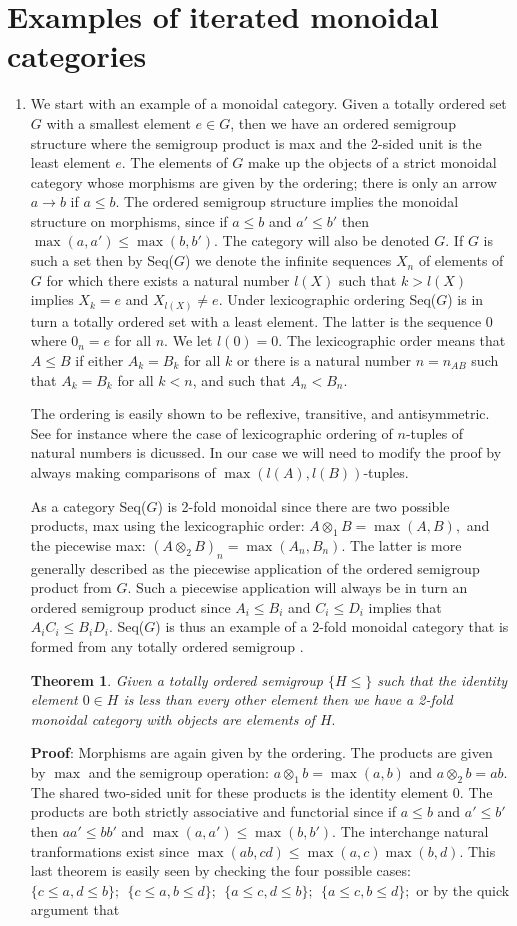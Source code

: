 \documentclass{tac}
\newtheorem{theorem}{Theorem}
\newcommand{\MySection}[1]
{\section{ #1}}
\begin{document}
{\newpage   
\MySection{Examples of iterated monoidal categories} 
\begin{enumerate}
\item
We start with an example of a monoidal category. Given a totally ordered set $G$ with a smallest element $e \in G$, 
then we have an ordered semigroup structure where the semigroup product is max and the 2-sided unit is the
least element $e$. The elements of $G$ make up the objects of a strict monoidal category whose morphisms are
given by the ordering; there is only an arrow $a \to b$ if $a\le b.$ The ordered semigroup structure implies
the monoidal structure on morphisms, since if $a\le b$ and $a'\le b'$ 
 then $\max(a,a')\le\max(b,b').$ The category will also be denoted $G.$ 
If $G$ is such a set then by Seq($G$) we denote the infinite sequences $X_n$ of elements of $G$ for which
there exists a natural number $l(X)$ such that $k> l(X)$ implies $X_k = e$ and $X_{l(X)}\ne e.$ 
Under lexicographic ordering Seq($G$) is
in turn a totally ordered set with a least element. The latter is the sequence 0 where $0_n = e$ for all $n.$
We let $l(0) = 0.$
The lexicographic order
means that $A \le B$ if either $A_k = B_k$ for all $k$ or there is a natural number $n=n_{AB}$ such that 
$A_k = B_k$ for all $k < n$, and such that $A_{n} < B_{n}.$ 

The ordering is easily shown to be reflexive, transitive, and antisymmetric. See for instance \cite{Schrod}
where the case of lexicographic ordering of $n$-tuples of natural numbers is dicussed. In our case we will need
to modify the proof by always making comparisons of $\max(l(A),l(B))$-tuples. 

As a category Seq($G$) is 2-fold monoidal since 
there are two possible products, max using the lexicographic order: $A\otimes_1 B = \max(A,B),$ 
and the piecewise max: $(A \otimes_2 B)_n = \max(A_n, B_n).$ The latter is  more generally described as
the piecewise application of the ordered semigroup product from $G.$ Such a piecewise application
will always be in turn an ordered
semigroup product since $A_i \le B_i$ and $C_i \le D_i$
implies that $A_iC_i \le B_iD_i$. Seq($G$) is thus an example of 
a $2$-fold monoidal category that is formed from any totally ordered semigroup . 
\begin{theorem}\label{semi}
Given a totally ordered semigroup $\{H\le\}$
such that the
identity element $0 \in H$ is less than every other element then 
we have a 2-fold monoidal category with 
objects are elements of $H.$ 
\end{theorem}
{\bf Proof}: Morphisms
are again given by the ordering. The products are given by
 $\max$ and the semigroup operation: $a\otimes_1b = \max(a,b)$ and $a\otimes_2b = ab$. 
 The shared two-sided unit for these products is 
 the identity element $0.$ The products are both strictly associative and functorial since if $a\le b$ and $a'\le b'$ 
 then $aa'\le bb'$ and $\max(a,a')\le\max(b,b').$
 The interchange natural tranformations exist since $\max(ab,cd)\le\max(a,c)\max(b,d).$ This last theorem is easily seen by checking the four
 possible cases: $\{c\le a, d\le b\};~~\{c\le a, b\le d\};~~\{a\le c, d\le b\};~~\{a\le c, b\le d\};$ or by the 
 quick argument that
 

\end{enumerate}}
\end{document}
